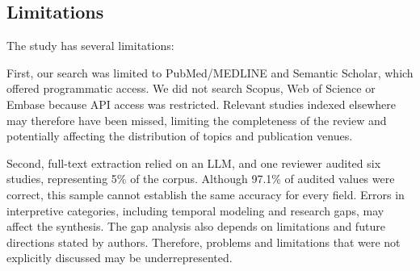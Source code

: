 






\subsection{Limitations}
\label{sec:limitations}
The study has several limitations:


First, our search was limited to PubMed/\allowbreak MEDLINE and Semantic Scholar, which offered programmatic access. We did not search Scopus, Web of Science or Embase because API access was restricted. Relevant studies indexed elsewhere may therefore have been missed, limiting the completeness of the review and potentially affecting the distribution of topics and publication venues. 


Second, full-text extraction relied on an LLM, and one reviewer audited six studies, representing 5\% of the corpus. Although 97.1\% of audited values were correct, this sample cannot establish the same accuracy for every field. Errors in interpretive categories, including temporal modeling and research gaps, may affect the synthesis. The gap analysis also depends on limitations and future directions stated by authors. Therefore, problems and limitations that were not explicitly discussed may be underrepresented. 

